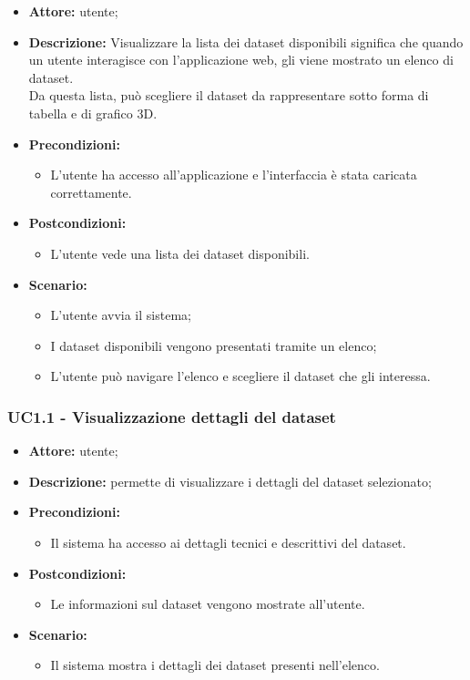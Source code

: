 \begin{itemize}
    \item \textbf{Attore:} utente;
    \item \textbf{Descrizione:} Visualizzare la lista dei dataset disponibili significa che quando un utente interagisce con l'applicazione web,
    gli viene mostrato un elenco di dataset.\\ Da questa lista, può scegliere il dataset da rappresentare sotto forma di tabella e di grafico 3D.
    \item \textbf{Precondizioni:}
    \begin{itemize}
        \item L'utente ha accesso all'applicazione e l'interfaccia è stata caricata correttamente.
    \end{itemize}
    \item \textbf{Postcondizioni:}
    \begin{itemize}
        \item L'utente vede una lista dei dataset disponibili.
    \end{itemize}
    \item \textbf{Scenario:} 
    \begin{itemize}
        \item L'utente avvia il sistema;
        \item I dataset disponibili vengono presentati tramite un elenco;
        \item L'utente può navigare l'elenco e scegliere il dataset che gli interessa.
    \end{itemize}
\end{itemize}
\newpage
\subsubsection{UC1.1 - Visualizzazione dettagli del dataset}
\begin{itemize}
    \item \textbf{Attore:} utente;
    \item \textbf{Descrizione:} permette di visualizzare i dettagli del dataset selezionato;
    \item \textbf{Precondizioni:}
    \begin{itemize}
        \item Il sistema ha accesso ai dettagli tecnici e descrittivi del dataset.
    \end{itemize}
    \item \textbf{Postcondizioni:}
    \begin{itemize}
        \item Le informazioni sul dataset vengono mostrate all'utente.
    \end{itemize}
    \item \textbf{Scenario:}
    \begin{itemize}
        \item Il sistema mostra i dettagli dei dataset presenti nell'elenco.
    \end{itemize}
\end{itemize}
